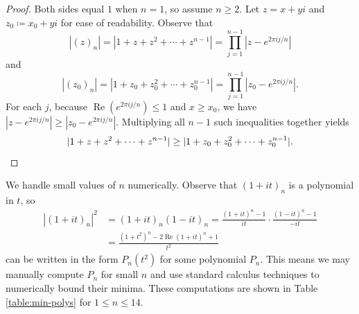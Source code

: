 \documentclass[11pt]{article}
\theoremstyle{definition}
\renewcommand{\Re}{\operatorname{Re}}
\begin{document}
\begin{proof}
	Both sides equal $1$ when $n = 1$, so assume $n\geq 2$.  Let $z = x + yi$ and $z_0 \coloneqq x_0 + yi$ for ease of readability.  Observe that
	\[
	|(z)_n| = |1 + z + z^2 + \cdots + z^{n-1}| = \prod_{j=1}^{n-1}|z - e^{2\pi ij/n}|
	\] 
	and
	\[
	|(z_0)_n| = |1 + z_0 + z_0^2 + \cdots + z_0^{n-1}| = \prod_{j=1}^{n-1}|z_0 - e^{2\pi ij/n}|.
	\]
	For each $j$, because $\Re(e^{2\pi ij/n}) \leq 1$ and $x\geq x_0$, we have $|z - e^{2\pi ij/n}| \geq |z_0 - e^{2\pi ij/n}|$.  Multiplying all $n-1$ such inequalities together yields
	\[
	|1 + z + z^2 + \cdots + z^{n-1}| \geq |1 + z_0 + z_0^2 + \cdots + z_0^{n-1}|.\qedhere
	\]
\end{proof}

We handle small values of $n$ numerically.  Observe that $(1+it)_n$ is a polynomial in $t$, so
\begin{align*}
	|(1+it)_n|^2 &= (1+it)_n(1-it)_n = \frac{(1+it)^n - 1}{it}\cdot \frac{(1-it)^n - 1}{-it}\\
	&= \frac{(1+t^2)^n - 2\Re(1+it)^n + 1}{t^2}
\end{align*} can be written in the form $P_n(t^2)$ for some polynomial $P_n$.  This means we may manually compute $P_n$ for small $n$ and use standard calculus techniques to numerically bound their minima.  These computations are shown in Table \ref{table:min-polys} for $1\leq n \leq 14$.
\end{document}
